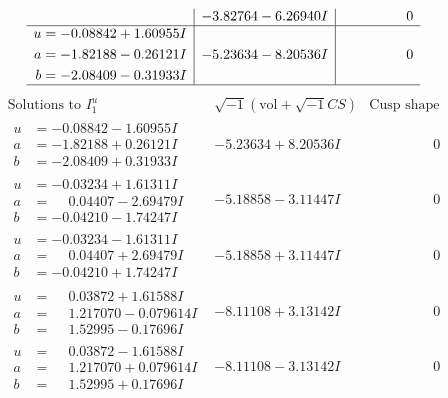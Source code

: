 \documentclass[1p]{elsarticle_modified}
\theoremstyle{definition}
\newcommand{\I}{\sqrt{-1}}
\begin{document}
$$\begin{array}{c|c|c}
 & -3.82764 - 6.26940 I & \phantom{-0.000000 } 0 \\ \hline\begin{aligned}
u &= -0.08842 + 1.60955 I \\
a &= -1.82188 - 0.26121 I \\
b &= -2.08409 - 0.31933 I\end{aligned}
 & -5.23634 - 8.20536 I & \phantom{-0.000000 } 0\\
 \hline 
 \end{array}$$\newpage$$\begin{array}{c|c|c}  
\text{Solutions to }I^u_{1}& \I (\text{vol} + \sqrt{-1}CS) & \text{Cusp shape}\\
 \hline 
\begin{aligned}
u &= -0.08842 - 1.60955 I \\
a &= -1.82188 + 0.26121 I \\
b &= -2.08409 + 0.31933 I\end{aligned}
 & -5.23634 + 8.20536 I & \phantom{-0.000000 } 0 \\ \hline\begin{aligned}
u &= -0.03234 + 1.61311 I \\
a &= \phantom{-}0.04407 - 2.69479 I \\
b &= -0.04210 - 1.74247 I\end{aligned}
 & -5.18858 - 3.11447 I & \phantom{-0.000000 } 0 \\ \hline\begin{aligned}
u &= -0.03234 - 1.61311 I \\
a &= \phantom{-}0.04407 + 2.69479 I \\
b &= -0.04210 + 1.74247 I\end{aligned}
 & -5.18858 + 3.11447 I & \phantom{-0.000000 } 0 \\ \hline\begin{aligned}
u &= \phantom{-}0.03872 + 1.61588 I \\
a &= \phantom{-}1.217070 - 0.079614 I \\
b &= \phantom{-}1.52995 - 0.17696 I\end{aligned}
 & -8.11108 + 3.13142 I & \phantom{-0.000000 } 0 \\ \hline\begin{aligned}
u &= \phantom{-}0.03872 - 1.61588 I \\
a &= \phantom{-}1.217070 + 0.079614 I \\
b &= \phantom{-}1.52995 + 0.17696 I\end{aligned}
 & -8.11108 - 3.13142 I & \phantom{-0.000000 } 0 \\ \hline\begin{aligned}

\end{aligned}
\end{array}$$
\end{document}
